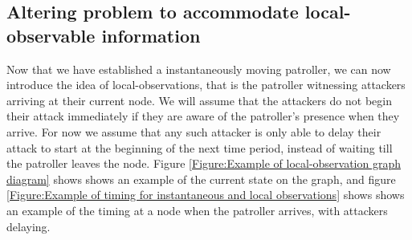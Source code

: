 \documentclass[a4paper,10pt]{article}
\theoremstyle{definition}
\theoremstyle{definition}
\theoremstyle{remark}
\theoremstyle{definition}
\begin{document}
\subsection{Altering problem to accommodate local-observable information}
Now that we have established a instantaneously moving patroller, we can now introduce the idea of local-observations, that is the patroller witnessing attackers arriving at their current node. We will assume that the attackers do not begin their attack immediately if they are aware of the patroller's presence when they arrive. For now we assume that any such attacker is only able to delay their attack to start at the beginning of the next time period, instead of waiting till the patroller leaves the node. Figure \ref{Figure:Example of local-observation graph diagram} shows shows an example of the current state on the graph, and figure \ref{Figure:Example of timing for instantaneous and local observations} shows shows an example of the timing at a node when the patroller arrives, with attackers delaying.
\end{document}
